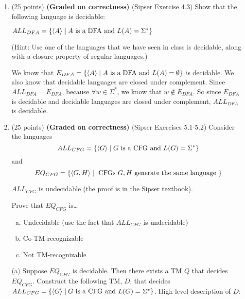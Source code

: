 \documentclass{article}
\theoremstyle{definition}
\newenvironment {solution}
{
\begin{tcolorbox}
}
{
\end{tcolorbox}
}
\begin{document}
\begin{enumerate}
    \item (25 points) \textbf{(Graded on correctness)} (Sipser Exercise 4.3) Show that the following language is decidable:
        
        $ALL_{DFA} = \{\langle A\rangle \mid A \textnormal{ is a DFA and } L(A) = \Sigma^*\}$
        
        (Hint: Use one of the languages that we have seen in class is decidable, along with a closure property of regular languages.)

        \begin{solution}
            We know that $E_{DFA} = \{\langle A\rangle \mid A \textnormal{ is a 
            DFA and } L(A) = \emptyset\}$ is decidable. We also know that 
            decidable languages are closed under complement. 
            Since $ALL_{DFA} = \overline{E_{DFA}}$, because $\forall w \in
            \Sigma^*$, we know that $w \notin E_{DFA}$. So since $E_{DFA}$ is
            decidable and decidable languages are closed under complement,
            $ALL_{DFA}$ is decidable.
        \end{solution}


    \item (25 points) \textbf{(Graded on correctness)} (Sipser Exercises 5.1-5.2) Consider the languages 
        \[ALL_{CFG} = \{\langle G\rangle \mid G \textnormal{ is a CFG and } L(G) = \Sigma^*\}\]
        and
        \[        EQ_{CFG} = \{\langle G, H\rangle \mid \textnormal{ CFGs } G,H \\
         \textnormal{ generate the same language }\}
        \]

    $ALL_{CFG}$ is undecidable (the proof is in the Sipser textbook).
    
    Prove that $EQ_{CFG}$ is\dots
    
    \begin{enumerate}[(a)]
        \item Undecidable (use the fact that $ALL_{CFG}$ is undecidable)
        \item Co-TM-recognizable
        \item Not TM-recognizable
    \end{enumerate}

    \begin{solution}
        (a) Suppose $EQ_{CFG}$ is decidable. Then there exists a TM $Q$ that 
        decides $EQ_{CFG}$. Construct the following TM, $D$, that decides 
        $ALL_{CFG} = \{\langle G\rangle \mid G \textnormal{ is a CFG and } L(G) = \Sigma^*\}$.
        High-level description of $D$:
            

\end{solution}
\end{enumerate}
\end{document}
